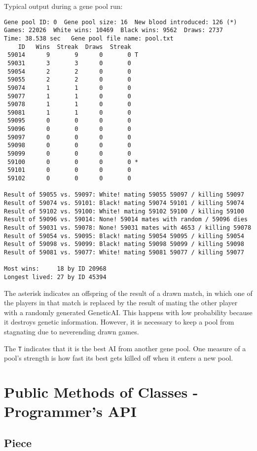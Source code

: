 \documentclass[letter]{article}
\renewcommand\_{\textunderscore\allowbreak}
\begin{document}
Typical output during a gene pool run:
\begin{verbatim}
Gene pool ID: 0  Gene pool size: 16  New blood introduced: 126 (*)
Games: 22026  White wins: 10469  Black wins: 9562  Draws: 2737
Time: 38.538 sec   Gene pool file name: pool.txt
    ID   Wins  Streak  Draws  Streak
 59014      9       9      0       0 T
 59031      3       3      0       0
 59054      2       2      0       0
 59055      2       2      0       0
 59074      1       1      0       0
 59077      1       1      0       0
 59078      1       1      0       0
 59081      1       1      0       0
 59095      0       0      0       0
 59096      0       0      0       0
 59097      0       0      0       0
 59098      0       0      0       0
 59099      0       0      0       0
 59100      0       0      0       0 *
 59101      0       0      0       0
 59102      0       0      0       0

Result of 59055 vs. 59097: White! mating 59055 59097 / killing 59097
Result of 59074 vs. 59101: Black! mating 59074 59101 / killing 59074
Result of 59102 vs. 59100: White! mating 59102 59100 / killing 59100
Result of 59096 vs. 59014: None! 59014 mates with random / 59096 dies
Result of 59031 vs. 59078: None! 59031 mates with 4653 / killing 59078
Result of 59054 vs. 59095: Black! mating 59054 59095 / killing 59054
Result of 59098 vs. 59099: Black! mating 59098 59099 / killing 59098
Result of 59081 vs. 59077: White! mating 59081 59077 / killing 59077

Most wins:     18 by ID 20968
Longest lived: 27 by ID 45394

\end{verbatim}
The asterisk indicates an offspring of the result of a drawn match, in which one of the players in that match is replaced by the result of mating the other player with a randomly generated Genetic\_AI. This happens with low probability because it destroys genetic information. However, it is necessary to keep a pool from stagnating due to neverending drawn games.

The \verb|T| indicates that it is the best AI from another gene pool. One measure of a pool's strength is how fast its best gets killed off when it enters a new pool.


\section{Public Methods of Classes - Programmer's API}

\subsection{Piece}
\end{document}
